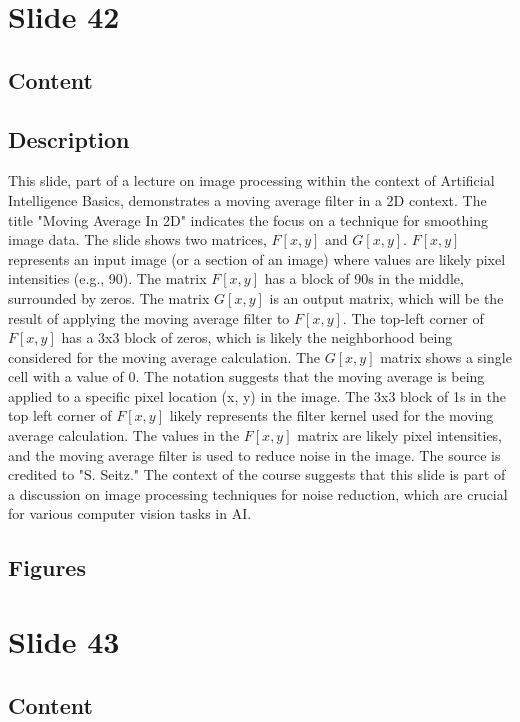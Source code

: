 \documentclass{article}%
\begin{document}
%
\newpage%
\section{Slide 42}%
\label{sec:Slide42}%
\subsection{Content}%
%
\subsection{Description}%
This slide, part of a lecture on image processing within the context of Artificial Intelligence Basics, demonstrates a moving average filter in a 2D context.  The title "Moving Average In 2D" indicates the focus on a technique for smoothing image data.  The slide shows two matrices, $F[x, y]$ and $G[x, y]$.  $F[x, y]$ represents an input image (or a section of an image) where values are likely pixel intensities (e.g., 90).  The matrix $F[x, y]$ has a block of 90s in the middle, surrounded by zeros.  The matrix $G[x, y]$ is an output matrix, which will be the result of applying the moving average filter to $F[x, y]$.  The top-left corner of $F[x, y]$ has a 3x3 block of zeros, which is likely the neighborhood being considered for the moving average calculation.  The $G[x, y]$ matrix shows a single cell with a value of 0.  The notation suggests that the moving average is being applied to a specific pixel location (x, y) in the image.  The 3x3 block of 1s in the top left corner of $F[x, y]$ likely represents the filter kernel used for the moving average calculation.  The values in the $F[x, y]$ matrix are likely pixel intensities, and the moving average filter is used to reduce noise in the image.  The source is credited to "S. Seitz."  The context of the course suggests that this slide is part of a discussion on image processing techniques for noise reduction, which are crucial for various computer vision tasks in AI.%
\subsection{Figures}%
\begin{figure}[H]%
\centering%
\end{figure}

%
\newpage%
\section{Slide 43}%
\label{sec:Slide43}%
\subsection{Content}%
%
\end{document}
